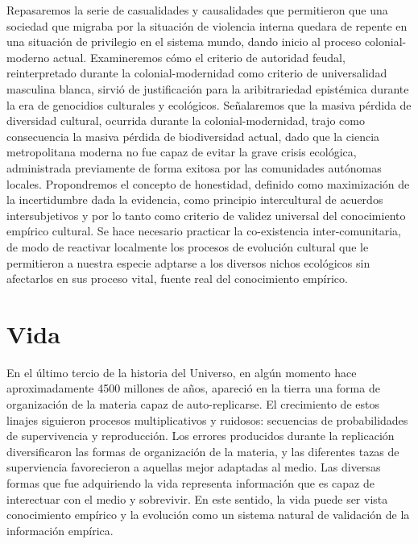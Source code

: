\documentclass[a4paper,10pt]{book}
\begin{document}
Repasaremos la serie de casualidades y causalidades que permitieron que una sociedad que migraba por la situación de violencia interna quedara de repente en una situación de privilegio en el sistema mundo, dando inicio al proceso colonial-moderno actual.
Examineremos cómo el criterio de autoridad feudal, reinterpretado durante la colonial-modernidad como criterio de universalidad masculina blanca, sirvió de justificación para la aribitrariedad epistémica durante la era de genocidios culturales y ecológicos.
Señalaremos que la masiva pérdida de diversidad cultural, ocurrida durante la colonial-modernidad, trajo como consecuencia la masiva pérdida de biodiversidad actual, dado que la ciencia metropolitana moderna no fue capaz de evitar la grave crisis ecológica, administrada previamente de forma exitosa por las comunidades autónomas locales.
Propondremos el concepto de honestidad, definido como maximización de la incertidumbre dada la evidencia, como principio intercultural de acuerdos intersubjetivos y por lo tanto como criterio de validez universal del conocimiento empírico cultural.
Se hace necesario practicar la co-existencia inter-comunitaria, de modo de reactivar localmente los procesos de evolución cultural que le permitieron a nuestra especie adptarse a los diversos nichos ecológicos sin afectarlos en sus proceso vital, fuente real del conocimiento empírico.
 
\section{Vida}\label{sec:vida}

En el último tercio de la historia del Universo, en algún momento hace aproximadamente 4500 millones de años, apareció en la tierra una forma de organización de la materia capaz de auto-replicarse.
El crecimiento de estos linajes siguieron procesos multiplicativos y ruidosos: secuencias de probabilidades de supervivencia y reproducción.
Los errores producidos durante la replicación diversificaron las formas de organización de la materia, y las diferentes tazas de superviencia favorecieron a aquellas mejor adaptadas al medio.
Las diversas formas que fue adquiriendo la vida representa información que es capaz de interectuar con el medio y sobrevivir.
En este sentido, la vida puede ser vista conocimiento empírico y la evolución como un sistema natural de validación de la información empírica.

\end{document}

